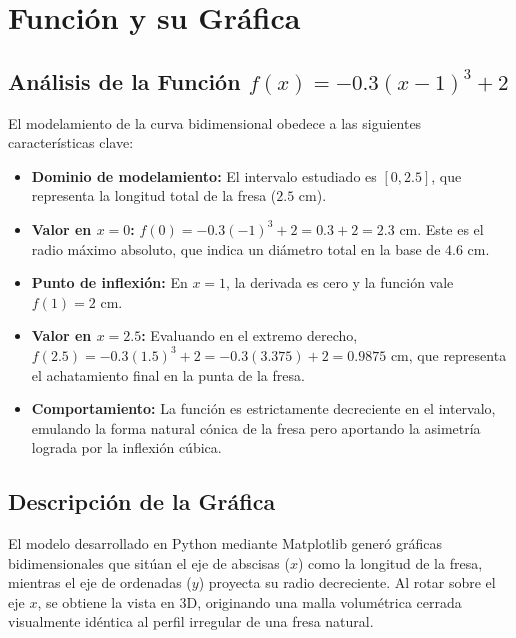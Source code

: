 \documentclass[conference, Spanish]{IEEEtran}
\begin{document}
\section{Función y su Gráfica}
\subsection{Análisis de la Función $f(x) = -0.3(x-1)^3 + 2$}
El modelamiento de la curva bidimensional obedece a las siguientes características clave:
\begin{itemize}
    \item \textbf{Dominio de modelamiento:} El intervalo estudiado es $[0, 2.5]$, que representa la longitud total de la fresa ($2.5$ cm).
    \item \textbf{Valor en $x = 0$:} $f(0) = -0.3(-1)^3 + 2 = 0.3 + 2 = 2.3$ cm. Este es el radio máximo absoluto, que indica un diámetro total en la base de $4.6$ cm.
    \item \textbf{Punto de inflexión:} En $x=1$, la derivada es cero y la función vale $f(1) = 2$ cm.
    \item \textbf{Valor en $x = 2.5$:} Evaluando en el extremo derecho, $f(2.5) = -0.3(1.5)^3 + 2 = -0.3(3.375) + 2 = 0.9875$ cm, que representa el achatamiento final en la punta de la fresa.
    \item \textbf{Comportamiento:} La función es estrictamente decreciente en el intervalo, emulando la forma natural cónica de la fresa pero aportando la asimetría lograda por la inflexión cúbica.
\end{itemize}

\subsection{Descripción de la Gráfica}
El modelo desarrollado en Python mediante Matplotlib generó gráficas bidimensionales que sitúan el eje de abscisas ($x$) como la longitud de la fresa, mientras el eje de ordenadas ($y$) proyecta su radio decreciente. Al rotar sobre el eje $x$, se obtiene la vista en 3D, originando una malla volumétrica cerrada visualmente idéntica al perfil irregular de una fresa natural.
\end{document}
